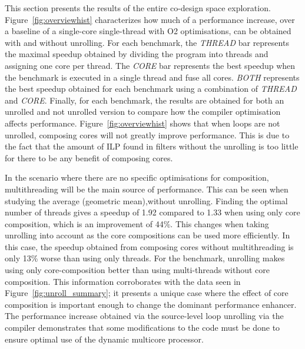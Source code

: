 This section  presents the results of the entire co-design space exploration.
Figure~\ref{fig:overviewhist} characterizes how much of a performance increase, over a baseline of a single-core single-thread with O2 optimisations, can be obtained with and without unrolling.
For each benchmark, the \textit{THREAD} bar represents the maximal speedup obtained by dividing the program into threads and assigning one core per thread.
The \textit{CORE} bar represents the best speedup when the benchmark is executed in a single thread and fuse all cores.
\textit{BOTH} represents the best speedup obtained for each benchmark using a combination of \textit{THREAD} and \textit{CORE}.
Finally, for each benchmark, the results are obtained for both an unrolled and not unrolled version to compare how the compiler optimisation affects performance.
Figure~\ref{fig:overviewhist} shows that when loops are not unrolled, composing cores will not greatly improve performance.
This is due to the fact that the amount of ILP found in filters without the unrolling is too little for there to be any benefit of composing cores.

In the scenario where there are no specific optimisations for composition, multithreading will be the main source of performance.
This can be seen when studying the average (geometric mean),without unrolling.
Finding the optimal number of threads gives a speedup of 1.92 compared to 1.33 when using only core composition, which is an improvement of 44\%.
This changes when taking unrolling into account as the core compositions can be used more efficiently.
In this case, the speedup obtained from composing cores without multithreading is only 13\% worse than using only threads.
For the  benchmark, unrolling makes using only core-composition better than using multi-threads without core composition.
This information corroborates with the data seen in Figure~\ref{fig:unroll_summary}; it presents a unique case where the effect of core composition is important enough to change the dominant performance enhancer.
The performance increase obtained via the source-level loop unrolling via the compiler demonstrates that some modifications to the code must be done to ensure optimal use of the dynamic multicore processor.

